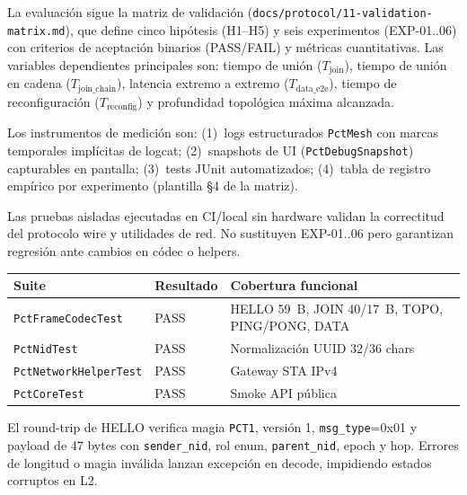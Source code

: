 \newpage
{}


La evaluación sigue la matriz de validación (\texttt{docs/protocol/11-validation-matrix.md}), que define cinco hipótesis (H1--H5) y seis experimentos (EXP-01..06) con criterios de aceptación binarios (PASS/FAIL) y métricas cuantitativas. Las variables dependientes principales son: tiempo de unión ($T_{\mathrm{join}}$), tiempo de unión en cadena ($T_{\mathrm{join\_chain}}$), latencia extremo a extremo ($T_{\mathrm{data\_e2e}}$), tiempo de reconfiguración ($T_{\mathrm{reconfig}}$) y profundidad topológica máxima alcanzada.

Los instrumentos de medición son: (1)~logs estructurados \texttt{PctMesh} con marcas temporales implícitas de logcat; (2)~snapshots de UI (\texttt{PctDebugSnapshot}) capturables en pantalla; (3)~tests JUnit automatizados; (4)~tabla de registro empírico por experimento (plantilla §4 de la matriz).


Las pruebas aisladas ejecutadas en CI/local sin hardware validan la correctitud del protocolo wire y utilidades de red. No sustituyen EXP-01..06 pero garantizan regresión ante cambios en códec o helpers.

\begin{center}
\small
\begin{tabular}{@{}p{4.5cm}p{2cm}p{6.5cm}@{}}
\hline
\textbf{Suite} & \textbf{Resultado} & \textbf{Cobertura funcional} \\
\hline
\texttt{PctFrameCodecTest} & PASS & HELLO 59~B, JOIN 40/17~B, TOPO, PING/PONG, DATA \\
\texttt{PctNidTest} & PASS & Normalización UUID 32/36 chars \\
\texttt{PctNetworkHelperTest} & PASS & Gateway STA IPv4 \\
\texttt{PctCoreTest} & PASS & Smoke API pública \\
\hline
\end{tabular}
\end{center}

El round-trip de HELLO verifica magia \texttt{PCT1}, versión 1, \texttt{msg\_type}=0x01 y payload de 47 bytes con \texttt{sender\_nid}, rol enum, \texttt{parent\_nid}, epoch y hop. Errores de longitud o magia inválida lanzan excepción en decode, impidiendo estados corruptos en L2.

